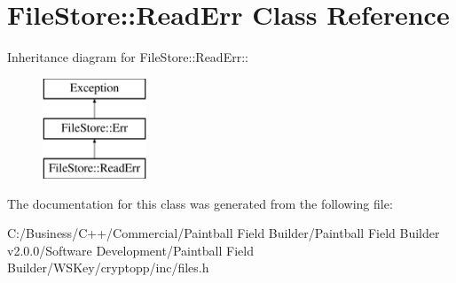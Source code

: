 \hypertarget{class_file_store_1_1_read_err}{
\section{FileStore::ReadErr Class Reference}
\label{class_file_store_1_1_read_err}
}
Inheritance diagram for FileStore::ReadErr::\begin{figure}[H]
\begin{center}
\leavevmode
\includegraphics[height=3cm]{class_file_store_1_1_read_err}
\end{center}
\end{figure}


The documentation for this class was generated from the following file:\begin{DoxyCompactItemize}
\item 
C:/Business/C++/Commercial/Paintball Field Builder/Paintball Field Builder v2.0.0/Software Development/Paintball Field Builder/WSKey/cryptopp/inc/files.h\end{DoxyCompactItemize}
